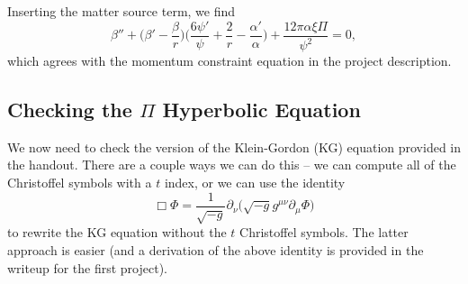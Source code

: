 \documentclass[12pt]{article}
\numberwithin{equation}{section}
\begin{document}
Inserting the matter source term, we find
\begin{equation}
\boxed{\beta'' + \Big( \beta' - \frac{\beta}{r} \Big) \Big( \frac{6 \psi'}{\psi} + \frac{2}{r} - \frac{\alpha'}{\alpha} \Big) + \frac{12 \pi \alpha \xi \Pi}{\psi^2} = 0},
\end{equation}
which agrees with the momentum constraint equation in the project description.

\subsection{Checking the $\Pi$ Hyperbolic Equation}
We now need to check the version of the Klein-Gordon (KG) equation provided in the handout.  There are a couple ways we can do this -- we can compute all of the Christoffel symbols with a $t$ index, or we can use the identity
\begin{equation}
\Box \Phi = \frac{1}{\sqrt{-g}} \partial_\nu \Big( \sqrt{-g} g^{\mu \nu} \partial_\mu \Phi \Big)
\end{equation}
to rewrite the KG equation without the $t$ Christoffel symbols.  The latter approach is easier (and a derivation of the above identity is provided in the writeup for the first project).
\end{document}

